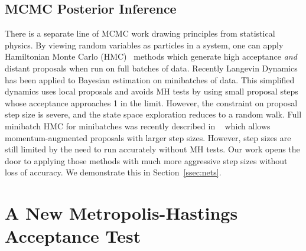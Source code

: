 \documentclass{article}
\begin{document}
\subsection{MCMC Posterior Inference}
There is a separate line of MCMC work drawing principles from
statistical physics. By viewing random variables as particles in a
system, one can apply Hamiltonian Monte Carlo
(HMC)~\cite{mcmc_hamiltonian_2010} methods which generate high
acceptance \emph{and} distant proposals when run on full batches of
data. Recently Langevin
Dynamics~\cite{langevin_2011,conf/icml/AhnBW12} has been applied to
Bayesian estimation on minibatches of data. This simplified dynamics
uses local proposals and avoids MH tests by using small proposal steps
whose acceptance approaches 1 in the limit. However, the constraint on
proposal step size is severe, and the state space exploration reduces
to a random walk. Full minibatch HMC for minibatches was recently
described in ~\cite{sghmc_2014} which allows momentum-augmented
proposals with larger step sizes. However, step sizes are still
limited by the need to run accurately without MH tests.
Our work opens the door to applying those methods with much
more aggressive step sizes without loss of accuracy. We demonstrate
this in Section~\ref{ssec:nets}.





\section{A New Metropolis-Hastings Acceptance Test}\label{sec:our_algorithm}
\end{document}
